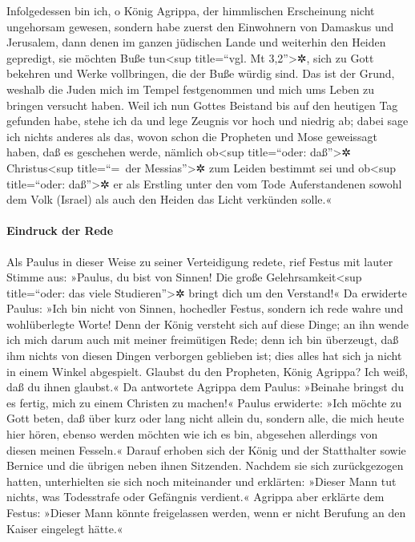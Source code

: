 Infolgedessen bin ich, o König Agrippa, der himmlischen
Erscheinung nicht ungehorsam gewesen,  sondern habe
zuerst den Einwohnern von Damaskus und Jerusalem, dann denen im ganzen
jüdischen Lande und weiterhin den Heiden gepredigt, sie möchten Buße
tun\textless sup title=``vgl. Mt 3,2''\textgreater✲, sich zu Gott
bekehren und Werke vollbringen, die der Buße würdig sind.
 Das ist der Grund, weshalb die Juden mich im Tempel
festgenommen und mich ums Leben zu bringen versucht haben.
 Weil ich nun Gottes Beistand bis auf den heutigen Tag
gefunden habe, stehe ich da und lege Zeugnis vor hoch und niedrig ab;
dabei sage ich nichts anderes als das, wovon schon die Propheten und
Mose geweissagt haben, daß es geschehen werde,  nämlich
ob\textless sup title=``oder: daß''\textgreater✲ Christus\textless sup
title=``=~der Messias''\textgreater✲ zum Leiden bestimmt sei und
ob\textless sup title=``oder: daß''\textgreater✲ er als Erstling unter
den vom Tode Auferstandenen sowohl dem Volk (Israel) als auch den Heiden
das Licht verkünden solle.«

\hypertarget{eindruck-der-rede}{%
\paragraph{Eindruck der Rede}\label{eindruck-der-rede}}

 Als Paulus in dieser Weise zu seiner Verteidigung
redete, rief Festus mit lauter Stimme aus: »Paulus, du bist von Sinnen!
Die große Gelehrsamkeit\textless sup title=``oder: das viele
Studieren''\textgreater✲ bringt dich um den Verstand!« 
Da erwiderte Paulus: »Ich bin nicht von Sinnen, hochedler Festus,
sondern ich rede wahre und wohlüberlegte Worte!  Denn der
König versteht sich auf diese Dinge; an ihn wende ich mich darum auch
mit meiner freimütigen Rede; denn ich bin überzeugt, daß ihm nichts von
diesen Dingen verborgen geblieben ist; dies alles hat sich ja nicht in
einem Winkel abgespielt.  Glaubst du den Propheten, König
Agrippa? Ich weiß, daß du ihnen glaubst.«  Da antwortete
Agrippa dem Paulus: »Beinahe bringst du es fertig, mich zu einem
Christen zu machen!«  Paulus erwiderte: »Ich möchte zu
Gott beten, daß über kurz oder lang nicht allein du, sondern alle, die
mich heute hier hören, ebenso werden möchten wie ich es bin, abgesehen
allerdings von diesen meinen Fesseln.«  Darauf erhoben
sich der König und der Statthalter sowie Bernice und die übrigen neben
ihnen Sitzenden.  Nachdem sie sich zurückgezogen hatten,
unterhielten sie sich noch miteinander und erklärten: »Dieser Mann tut
nichts, was Todesstrafe oder Gefängnis verdient.« 
Agrippa aber erklärte dem Festus: »Dieser Mann könnte freigelassen
werden, wenn er nicht Berufung an den Kaiser eingelegt hätte.«

